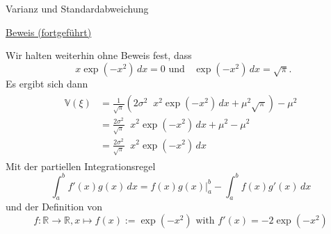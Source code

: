 \documentclass[
  8pt,
  ignorenonframetext,
]{beamer}
\DeclareMathOperator*{\intinf}{\int_{-\infty}^{\infty}}
\begin{document}
\begin{frame}{Varianz und Standardabweichung}
\protect\hypertarget{varianz-und-standardabweichung-5}{}
\footnotesize

\underline{Beweis (fortgeführt)} \vspace{1mm}

Wir halten weiterhin ohne Beweis fest, dass \begin{equation}
\intinf x \exp(-x^2)\,dx = 0
\mbox{ und }
\intinf \exp(-x^2)\,dx = \sqrt{\pi}.
\end{equation} Es ergibt sich dann \begin{align}
\begin{split}
\mathbb{V}(\xi)
& = \frac{1}{\sqrt{\pi}}
\left(2\sigma^2\intinf x^2 \exp\left(-x^2 \right)\,dx + \mu^2\sqrt{\pi} \right)
- \mu^2
\\
& = \frac{2\sigma^2}{\sqrt{\pi}}
\intinf x^2 \exp\left(-x^2 \right)\,dx
+ \mu^2 - \mu^2
\\
& = \frac{2\sigma^2}{\sqrt{\pi}} \intinf x^2 \exp\left(-x^2 \right)\,dx
\end{split}
\end{align} Mit der partiellen Integrationsregel \begin{equation}
\int_{a}^{b} f'(x)g(x)\,dx =
f(x)g(x)|_{a}^{b} - \int_{a}^{b} f(x)g'(x)\,dx
\end{equation} und der Definition von \begin{equation}
f : \mathbb{R} \to \mathbb{R}, x \mapsto f(x) := \exp(-x^2) \mbox{ with } f'(x) = -2\exp(-x^2)
\end{equation}
\end{frame}
\end{document}

